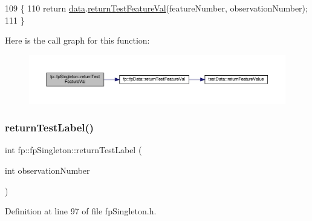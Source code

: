 \begin{DoxyCode}
109                                                                                                     \{
110                 \textcolor{keywordflow}{return} \hyperlink{classfp_1_1fpSingleton_a2fa16ac6a0f66641749032eeee61b8e9}{data}.\hyperlink{classfp_1_1fpData_a42f76961f1649e329d654e9e1bb13fc6}{returnTestFeatureVal}(featureNumber, observationNumber);
111             \}
\end{DoxyCode}
Here is the call graph for this function\+:\nopagebreak
\begin{figure}[H]
\begin{center}
\leavevmode
\includegraphics[width=350pt]{classfp_1_1fpSingleton_ad74b421d65b17ba924244bff31fc9db6_cgraph}
\end{center}
\end{figure}
\mbox{\label{classfp_1_1fpSingleton_ac0d2a2fd5ed471c8d507dfd544c12e6d}} 
\subsubsection{\texorpdfstring{return\+Test\+Label()}{returnTestLabel()}}
{\footnotesize\ttfamily int fp\+::fp\+Singleton\+::return\+Test\+Label (\begin{DoxyParamCaption}\item[{int}]{observation\+Number }\end{DoxyParamCaption})\hspace{0.3cm}{\ttfamily [inline]}}



Definition at line 97 of file fp\+Singleton.\+h.


